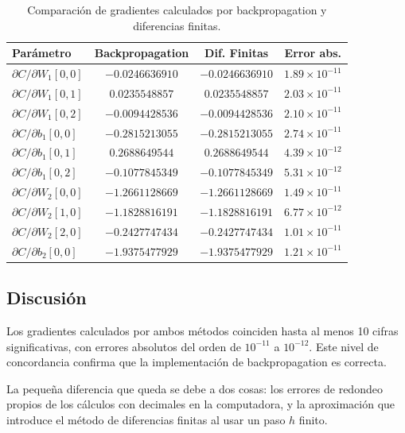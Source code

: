 \documentclass{article}
\begin{document}
\begin{table}[H]
\centering
\small
\begin{tabular}{lccc}
\hline
\textbf{Parámetro} & \textbf{Backpropagation} & \textbf{Dif. Finitas} & \textbf{Error abs.} \\
\hline
$\partial C/\partial W_1[0,0]$ & $-0.0246636910$ & $-0.0246636910$ & $1.89 \times 10^{-11}$ \\
$\partial C/\partial W_1[0,1]$ & $0.0235548857$ & $0.0235548857$ & $2.03 \times 10^{-11}$ \\
$\partial C/\partial W_1[0,2]$ & $-0.0094428536$ & $-0.0094428536$ & $2.10 \times 10^{-11}$ \\
$\partial C/\partial b_1[0,0]$ & $-0.2815213055$ & $-0.2815213055$ & $2.74 \times 10^{-11}$ \\
$\partial C/\partial b_1[0,1]$ & $0.2688649544$ & $0.2688649544$ & $4.39 \times 10^{-12}$ \\
$\partial C/\partial b_1[0,2]$ & $-0.1077845349$ & $-0.1077845349$ & $5.31 \times 10^{-12}$ \\
$\partial C/\partial W_2[0,0]$ & $-1.2661128669$ & $-1.2661128669$ & $1.49 \times 10^{-11}$ \\
$\partial C/\partial W_2[1,0]$ & $-1.1828816191$ & $-1.1828816191$ & $6.77 \times 10^{-12}$ \\
$\partial C/\partial W_2[2,0]$ & $-0.2427747434$ & $-0.2427747434$ & $1.01 \times 10^{-11}$ \\
$\partial C/\partial b_2[0,0]$ & $-1.9375477929$ & $-1.9375477929$ & $1.21 \times 10^{-11}$ \\
\hline
\end{tabular}
\caption{Comparación de gradientes calculados por backpropagation y diferencias finitas.}
\label{tab:p7_resultados}
\end{table}

\subsection{Discusión}

Los gradientes calculados por ambos métodos coinciden hasta al menos 10 cifras significativas, con errores absolutos del orden de $10^{-11}$ a $10^{-12}$. Este nivel de concordancia confirma que la implementación de backpropagation es correcta.

La pequeña diferencia que queda se debe a dos cosas: los errores de redondeo propios de los cálculos con decimales en la computadora, y la aproximación que introduce el método de diferencias finitas al usar un paso $h$ finito.
\end{document}
